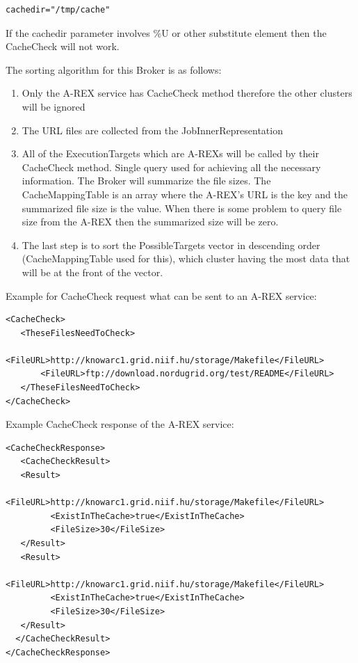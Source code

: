 \documentclass{book}
\begin{document}
\begin{shaded}
\begin{verbatim}
cachedir="/tmp/cache"
\end{verbatim}
\end{shaded}

If the cachedir parameter involves {\%}U or other substitute element then the CacheCheck will not work.

The sorting algorithm for this Broker is as follows:

\begin{enumerate}
\item{Only the A-REX service has CacheCheck method therefore the other clusters will be ignored}
\item{The URL files are collected from the JobInnerRepresentation }
\item{All of the ExecutionTargets which are A-REXs will be called by their  CacheCheck method. Single query used for achieving all the necessary information. The Broker will summarize the file sizes. The CacheMappingTable is an array where the A-REX's URL is the key and the summarized file size is the value. When there is some problem to query file size from the A-REX then the summarized size will be zero.}
\item{The last step is to sort the PossibleTargets vector in descending order  (CacheMappingTable used for this), which cluster having the most data that will be at the front of the vector.}
\end{enumerate}

Example for CacheCheck request what can be sent to an A-REX service:

\begin{shaded}
\begin{verbatim}
<CacheCheck>
   <TheseFilesNeedToCheck>
       <FileURL>http://knowarc1.grid.niif.hu/storage/Makefile</FileURL>
       <FileURL>ftp://download.nordugrid.org/test/README</FileURL>
   </TheseFilesNeedToCheck>
</CacheCheck>
\end{verbatim}
\end{shaded}

Example CacheCheck response of the A-REX service:

\begin{shaded}
\begin{verbatim}
<CacheCheckResponse>
   <CacheCheckResult>
   <Result>
         <FileURL>http://knowarc1.grid.niif.hu/storage/Makefile</FileURL>
         <ExistInTheCache>true</ExistInTheCache>
         <FileSize>30</FileSize>
   </Result>
   <Result>
         <FileURL>http://knowarc1.grid.niif.hu/storage/Makefile</FileURL>
         <ExistInTheCache>true</ExistInTheCache>
         <FileSize>30</FileSize>
   </Result>
  </CacheCheckResult>
</CacheCheckResponse>
\end{verbatim}
\end{shaded}
\end{document}
